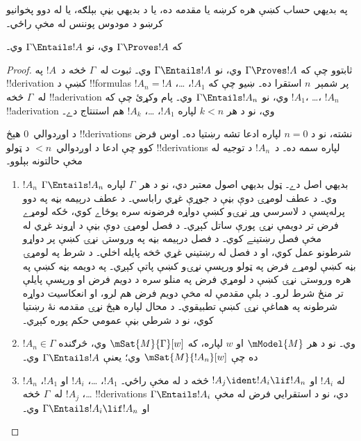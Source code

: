\documentclass[../../../include/open-logic-section]{subfiles}
\begin{document}


\begin{editorial}
  په بديهي حساب کښې هره کرښه يا مقدمه ده، يا د بديهي بڼې بېلګه،
  يا له دوو پخوانيو کرښو د مودوس پوننس له مخې راځي۔
\end{editorial}

\begin{thm}[سموالے]
  که $\Gamma \Proves !A$ وي، نو $ \Gamma \Entails !A$ وي۔
\end{thm}

\begin{proof}
  ثابتوو چې که $\Gamma \Proves !A$ وي، نو $\Gamma \Entails !A$
  وي۔ ثبوت له~$\Gamma$ څخه د~$!A$ په !!{derivation} کښې د
  !!{formula}s پر شمېر~$n$ استقرا ده۔ ښيو چې که $!A_1$،
  \dots، $!A_n = !A$ له~$\Gamma$ څخه !!a{derivation} وي، نو
  $\Gamma \Entails !A_n$ وي۔ پام وکړئ چې که $!A_1$، \dots،
  $!A_n$ !!a{derivation} وي، نو د هر $k<n$ لپاره $!A_1$،
  \dots، $!A_k$ هم استنتاج دے۔

  د اوږدوالي~$0$ هېڅ !!{derivation}s نشته، نو د $n=0$ لپاره ادعا
  تشه رښتيا ده۔ اوس فرض کوو چې ادعا د اوږدوالي~$<n$ د ټولو
  !!{derivation}s لپاره سمه ده۔ د~$!A_n$ د توجيه له مخې حالتونه
  بېلوو۔
  
  \begin{enumerate}
  \item $!A_n$ بديهي اصل دے۔ ټول بديهي اصول معتبر دي، نو
    د هر~$\Gamma$ لپاره $\Gamma \Entails !A_n$ وي۔
    د عطف لومړۍ دوې بڼې د جوړې غړي راباسي۔ د عطف درېيمه بڼه
    په دوو پرله‌پسې د لاسرسي وړ نړۍو کښې دواړه فرضونه سره يوځاے
    کوي، ځکه لومړے فرض تر دويمې نړۍ پورې ساتل کېږي۔ د فصل لومړۍ
    دوې بڼې د اړوند غړي له مخې فصل رښتينے کوي۔ د فصل درېيمه
    بڼه په وروستۍ نړۍ کښې پر دواړو شرطونو عمل کوي، او د فصل
    له رښتيني غړي څخه پايله اخلي۔ د شرط په لومړۍ بڼه کښې
    لومړے فرض په ټولو ورپسې نړۍو کښې پاتې کېږي۔ په دويمه
    بڼه کښې په هره وروستۍ نړۍ کښې د لومړي فرض په منلو سره
    د دويم فرض او ورپسې پايلې تر منځ شرط لرو۔ د بلې مقدمې
    له مخې دويم فرض هم لرو، او انعکاسيت دواړه شرطونه په
    هماغې نړۍ کښې تطبيقوي۔ د محال لپاره هېڅ نړۍ مقدمه نۀ
    رښتيا کوي، نو د شرطي بڼې عمومي حکم پوره کېږي۔
  \item $!A_n \in \Gamma$ وي۔ نو د هر $\mModel{M}$ او $w$
    لپاره، که $\mSat{M}{\Gamma}[w]$ وي، څرګنده ده چې
    $\mSat{M}{!A_n}[w]$ وي؛ يعنې $\Gamma \Entails !A$ وي۔
  \item $!A_n$ له $!A_i$ او $!A_j \ident !A_i \lif !A_n$ څخه د
    \MP{} له مخې راځي۔ $!A_1$، \dots، $!A_i$ او $!A_1$،
    \dots، $!A_j$ له~$\Gamma$ څخه !!{derivation}s دي، نو د
    استقرايي فرض له مخې $\Gamma \Entails !A_i$ او
    $\Gamma \Entails !A_i \lif !A_n$ وي۔
    

\end{enumerate}
\end{proof}
\end{document}
